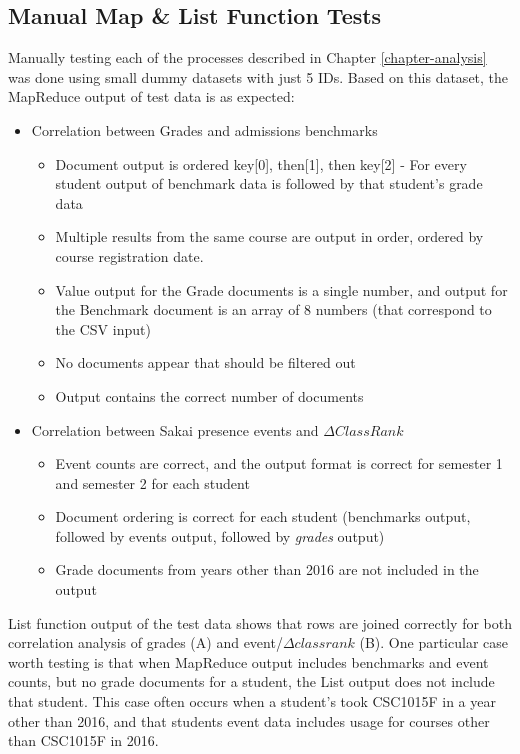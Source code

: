 \subsection{Manual Map \& List Function Tests}
Manually testing each of the processes described in Chapter \ref{chapter-analysis} was done using small dummy datasets with just 5 IDs. Based on this dataset, the MapReduce output of test data is as expected:

\begin{itemize}
  \item Correlation between Grades and admissions benchmarks
        \begin{itemize}
          \item Document output is ordered key[0], then[1], then key[2] - For every student output of benchmark data is followed by that student's grade data
          \item Multiple results from the same course are output in order, ordered by course registration date.
          \item Value output for the Grade documents is a single number, and output for the Benchmark document is an array of 8 numbers (that correspond to the CSV input)
          \item No documents appear that should be filtered out
          \item Output contains the correct number of documents
        \end{itemize}
  \item Correlation between Sakai presence events and $\Delta ClassRank$
        \begin{itemize}
          \item Event counts are correct, and the output format is correct for semester 1 and semester 2 for each student
          \item Document ordering is correct for each student (benchmarks output, followed by events output, followed by \textit{grades} output)
          \item Grade documents from years other than 2016 are not included in the output
        \end{itemize}
\end{itemize}

List function output of the test data shows that rows are joined correctly for both correlation analysis of grades (A) and event/$\Delta classrank$ (B). One particular case worth testing is that when MapReduce output includes benchmarks and event counts, but no grade documents for a student, the List output does not include that student. This case often occurs when a student's took CSC1015F in a year other than 2016, and that students event data includes usage for courses other than CSC1015F in 2016.

